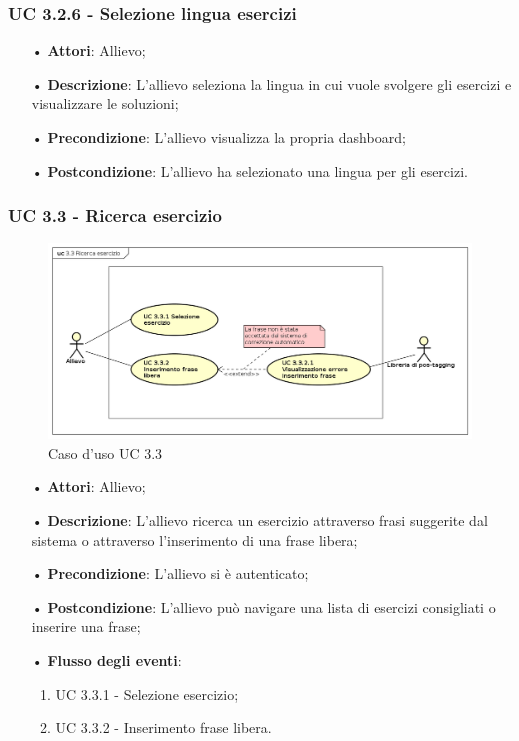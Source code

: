 \subsubsection{UC 3.2.6 - Selezione lingua esercizi}
\begin{itemize}
	\item[•]\textbf{Attori}: Allievo;
	\item[•]\textbf{Descrizione}: L'allievo seleziona la lingua in cui vuole svolgere gli esercizi e visualizzare le soluzioni;
	\item[•]\textbf{Precondizione}: L'allievo visualizza la propria dashboard;
	\item[•]\textbf{Postcondizione}: L'allievo ha selezionato una lingua per gli esercizi.
\end{itemize}

\subsubsection{UC 3.3 - Ricerca esercizio}
\begin{figure}[H]
\centering
\includegraphics[width=17cm]{img/UC33.png} 
\caption{Caso d'uso UC 3.3}\label{fig:33}
\end{figure}
\begin{itemize}
\item[•]\textbf{Attori}: Allievo;
\item[•]\textbf{Descrizione}: L'allievo ricerca un esercizio attraverso frasi suggerite dal sistema o attraverso l'inserimento di una frase libera;
\item[•]\textbf{Precondizione}: L'allievo si è autenticato;
\item[•]\textbf{Postcondizione}: L'allievo può navigare una lista di esercizi consigliati o inserire una frase;
\item[•]\textbf{Flusso degli eventi}:
\begin{enumerate}
\item UC 3.3.1 - Selezione esercizio;
\item UC 3.3.2 - Inserimento frase libera.
\end{enumerate}
\end{itemize}


